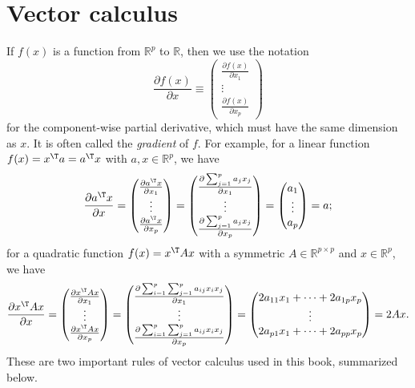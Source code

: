  


\section{Vector calculus}

If $f(x)$ is a function from $\mathbb{R}^p$ to $\mathbb{R}$, then we use the notation 
$$
\frac{\partial f(x)}{\partial  x} \equiv  \begin{pmatrix}
\frac{\partial f(x)}{\partial x_1} \\
\vdots \\
 \frac{\partial f(x)}{\partial  x_p}  
\end{pmatrix}
$$
for the component-wise partial derivative, which must have the same dimension as $x$. It is often called the {\it gradient} of $f.$
For example, for a linear function $f(x) = x^{\T} a = a^{\T} x$ with $a,x\in \mathbb{R}^p$, we have
\begin{eqnarray}\label{eq::diff-linear}
\frac{\partial a^{\T} x  }{\partial  x} = \begin{pmatrix}
\frac{\partial a^{\T} x}{\partial x_1} \\
\vdots \\
 \frac{\partial a^{\T} x}{\partial  x_p}  
\end{pmatrix}
= \begin{pmatrix}
 \frac{\partial \sum_{j=1}^p  a_j x_j }{\partial x_1} \\
\vdots \\
 \frac{\partial \sum_{j=1}^p  a_j x_j }{\partial  x_p}  
\end{pmatrix}
= \begin{pmatrix}
a_1 \\
\vdots \\
a_p
\end{pmatrix}
= a;
\end{eqnarray}
for a quadratic function $f(x) = x^{\T} A x $ with a symmetric $A\in \mathbb{R}^{p\times p}$  and $x \in \mathbb{R}^p$, we have 
$$
\frac{ \partial  x^{\T} A x }{ \partial  x} = \begin{pmatrix}
\frac{\partial x^{\T} A x}{\partial x_1} \\
\vdots \\
 \frac{\partial x^{\T} A x}{\partial  x_p}  
\end{pmatrix}
= \begin{pmatrix}
\frac{\partial   \sum_{i=1}^p \sum_{j=1}^p a_{ij} x_i x_j }{\partial x_1} \\
\vdots \\
 \frac{\partial  \sum_{i=1}^p \sum_{j=1}^p a_{ij} x_i x_j   }{\partial  x_p}  
\end{pmatrix} 
= \begin{pmatrix}
2 a_{11} x_1 + \cdots + 2a_{1p} x_p \\
\vdots \\
2 a_{p1} x_1 + \cdots + 2a_{pp} x_p
\end{pmatrix} 
=2 Ax .
$$
These are two important rules of vector calculus used in this book, summarized below.

